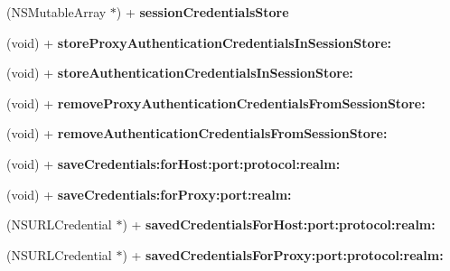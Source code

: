 \begin{DoxyCompactItemize}
\item 
\hypertarget{interface_a_s_i_h_t_t_p_request_ad6bf65e22787790d6781f7c091c9e2d0}{
(NSMutableArray $\ast$) + {\bfseries sessionCredentialsStore}}
\label{interface_a_s_i_h_t_t_p_request_ad6bf65e22787790d6781f7c091c9e2d0}

\item 
\hypertarget{interface_a_s_i_h_t_t_p_request_a3b4a0286f50236a836d6321946aa2050}{
(void) + {\bfseries storeProxyAuthenticationCredentialsInSessionStore:}}
\label{interface_a_s_i_h_t_t_p_request_a3b4a0286f50236a836d6321946aa2050}

\item 
\hypertarget{interface_a_s_i_h_t_t_p_request_a29a3e43083c8878d4f789b4e2bc9b0bb}{
(void) + {\bfseries storeAuthenticationCredentialsInSessionStore:}}
\label{interface_a_s_i_h_t_t_p_request_a29a3e43083c8878d4f789b4e2bc9b0bb}

\item 
\hypertarget{interface_a_s_i_h_t_t_p_request_a129c7d20fcf78c1a2038aed3690eceb6}{
(void) + {\bfseries removeProxyAuthenticationCredentialsFromSessionStore:}}
\label{interface_a_s_i_h_t_t_p_request_a129c7d20fcf78c1a2038aed3690eceb6}

\item 
\hypertarget{interface_a_s_i_h_t_t_p_request_ac04306801de4f656b5afafa252096af0}{
(void) + {\bfseries removeAuthenticationCredentialsFromSessionStore:}}
\label{interface_a_s_i_h_t_t_p_request_ac04306801de4f656b5afafa252096af0}

\item 
\hypertarget{interface_a_s_i_h_t_t_p_request_a9b1885aade1179e0d49cad69d8c15abe}{
(void) + {\bfseries saveCredentials:forHost:port:protocol:realm:}}
\label{interface_a_s_i_h_t_t_p_request_a9b1885aade1179e0d49cad69d8c15abe}

\item 
\hypertarget{interface_a_s_i_h_t_t_p_request_a12962e3fa0356a77478a1aac1f2d2def}{
(void) + {\bfseries saveCredentials:forProxy:port:realm:}}
\label{interface_a_s_i_h_t_t_p_request_a12962e3fa0356a77478a1aac1f2d2def}

\item 
\hypertarget{interface_a_s_i_h_t_t_p_request_a443ec6e082e2b1ab9d7568d6875068c7}{
(NSURLCredential $\ast$) + {\bfseries savedCredentialsForHost:port:protocol:realm:}}
\label{interface_a_s_i_h_t_t_p_request_a443ec6e082e2b1ab9d7568d6875068c7}

\item 
\hypertarget{interface_a_s_i_h_t_t_p_request_a9a85cf244d073467d56e328d83760f2d}{
(NSURLCredential $\ast$) + {\bfseries savedCredentialsForProxy:port:protocol:realm:}}
\label{interface_a_s_i_h_t_t_p_request_a9a85cf244d073467d56e328d83760f2d}


\end{DoxyCompactItemize}
